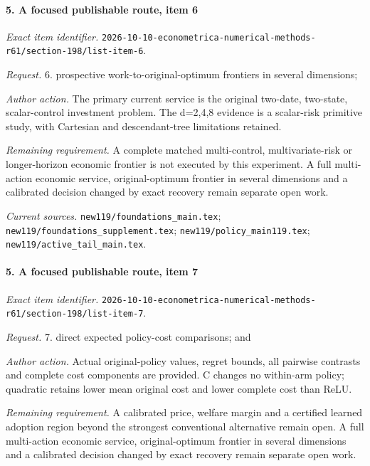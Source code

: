 \paragraph{5. A focused publishable route, item 6}

\emph{Exact item identifier.} \nolinkurl{2026-10-10-econometrica-numerical-methods-r61/section-198/list-item-6}.

\par\emph{Request.} 6. prospective work-to-original-optimum frontiers in several dimensions;

\par\emph{Author action.} The primary current service is the original two-date, two-state, scalar-control investment problem. The d=2,4,8 evidence is a scalar-risk primitive study, with Cartesian and descendant-tree limitations retained.

\par\emph{Remaining requirement.} A complete matched multi-control, multivariate-risk or longer-horizon economic frontier is not executed by this experiment. A full multi-action economic service, original-optimum frontier in several dimensions and a calibrated decision changed by exact recovery remain separate open work.

\par\emph{Current sources.} \nolinkurl{new119/foundations_main.tex}; \nolinkurl{new119/foundations_supplement.tex}; \nolinkurl{new119/policy_main119.tex}; \nolinkurl{new119/active_tail_main.tex}.

\paragraph{5. A focused publishable route, item 7}

\emph{Exact item identifier.} \nolinkurl{2026-10-10-econometrica-numerical-methods-r61/section-198/list-item-7}.

\par\emph{Request.} 7. direct expected policy-cost comparisons; and

\par\emph{Author action.} Actual original-policy values, regret bounds, all pairwise contrasts and complete cost components are provided. C changes no within-arm policy; quadratic retains lower mean original cost and lower complete cost than ReLU.

\par\emph{Remaining requirement.} A calibrated price, welfare margin and a certified learned adoption region beyond the strongest conventional alternative remain open. A full multi-action economic service, original-optimum frontier in several dimensions and a calibrated decision changed by exact recovery remain separate open work.

